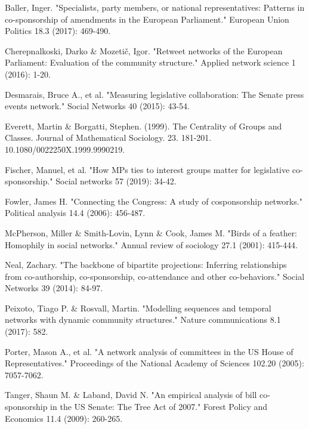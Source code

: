 \documentclass[lettersize,journal]{IEEEtran}
\begin{document}
\begin{thebibliography}{1}


Baller, Inger. "Specialists, party members, or national representatives: Patterns in co-sponsorship of amendments in the European Parliament." European Union Politics 18.3 (2017): 469-490.

Cherepnalkoski, Darko \& Mozetič, Igor. "Retweet networks of the European Parliament: Evaluation of the community structure." Applied network science 1 (2016): 1-20.

Desmarais, Bruce A., et al. "Measuring legislative collaboration: The Senate press events network." Social Networks 40 (2015): 43-54.

Everett, Martin \& Borgatti, Stephen. (1999). The Centrality of Groups and Classes. Journal of Mathematical Sociology. 23. 181-201. 10.1080/0022250X.1999.9990219.

Fischer, Manuel, et al. "How MPs ties to interest groups matter for legislative co-sponsorship." Social networks 57 (2019): 34-42.

Fowler, James H. "Connecting the Congress: A study of cosponsorship networks." Political analysis 14.4 (2006): 456-487.

McPherson, Miller \& Smith-Lovin, Lynn \& Cook, James M. "Birds of a feather: Homophily in social networks." Annual review of sociology 27.1 (2001): 415-444.

Neal, Zachary. "The backbone of bipartite projections: Inferring relationships from co-authorship, co-sponsorship, co-attendance and other co-behaviors." Social Networks 39 (2014): 84-97.

Peixoto, Tiago P. \& Rosvall, Martin. "Modelling sequences and temporal networks with dynamic community structures." Nature communications 8.1 (2017): 582.

Porter, Mason A., et al. "A network analysis of committees in the US House of Representatives." Proceedings of the National Academy of Sciences 102.20 (2005): 7057-7062.

Tanger, Shaun M. \& Laband, David N. "An empirical analysis of bill co-sponsorship in the US Senate: The Tree Act of 2007." Forest Policy and Economics 11.4 (2009): 260-265.

\end{thebibliography}
\end{document}
